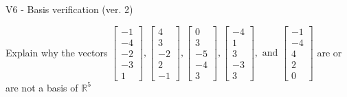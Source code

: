 \begin{exercise}
  \begin{exerciseTitle}V6 - Basis verification (ver. 2)\end{exerciseTitle}
  \begin{exerciseStatement}
    Explain why the vectors \(\left[\begin{array}{r}
-1 \\
-4 \\
-2 \\
-3 \\
1
\end{array}\right] , \left[\begin{array}{r}
4 \\
3 \\
-2 \\
2 \\
-1
\end{array}\right] , \left[\begin{array}{r}
0 \\
3 \\
-5 \\
-4 \\
3
\end{array}\right] , \left[\begin{array}{r}
-4 \\
1 \\
3 \\
-3 \\
3
\end{array}\right] , \text{ and } \left[\begin{array}{r}
-1 \\
-4 \\
4 \\
2 \\
0
\end{array}\right]\) are or are not a basis of \(\mathbb{R}^5\)	



\end{exerciseStatement}
\end{exercise}

